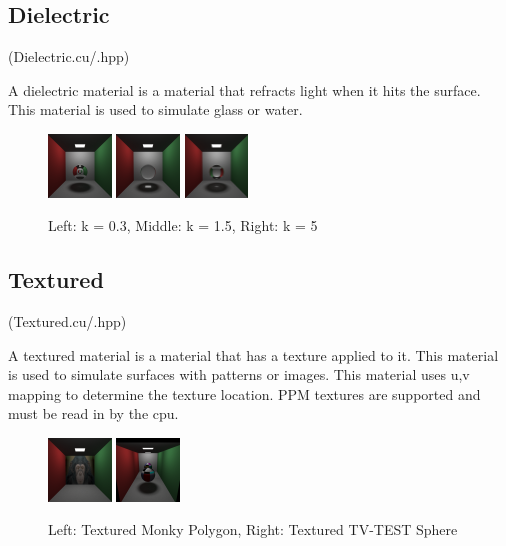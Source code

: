 \documentclass{article}
\begin{document}
    \subsection{Dielectric}
    (Dielectric.cu/.hpp)\par
    A dielectric material is a material that refracts light when it hits the surface. This material is used to simulate glass or water. \par
    \begin{figure}[H]
        \centering
        \includegraphics[width=0.15\textwidth]{samples/Dielectric0p3.png}
        \includegraphics[width=0.15\textwidth]{samples/Dielectric1p5.png}
        \includegraphics[width=0.15\textwidth]{samples/Dielectric5.png}
        \caption{Left: k = 0.3, Middle: k = 1.5, Right: k = 5}
    \end{figure}


    \subsection{Textured}
    (Textured.cu/.hpp)\par
    A textured material is a material that has a texture applied to it. This material is used to simulate surfaces with patterns or images. This material uses u,v mapping to determine the texture location. PPM textures are supported and must be read in by the cpu. \par
    \begin{figure}[H]
        \centering
        \includegraphics[width=0.15\textwidth]{samples/TexturedMonky.png}
        \includegraphics[width=0.15\textwidth]{samples/TexturedWMirror.png}
        \caption{Left: Textured Monky Polygon, Right: Textured TV-TEST Sphere}
    \end{figure}
\end{document}
